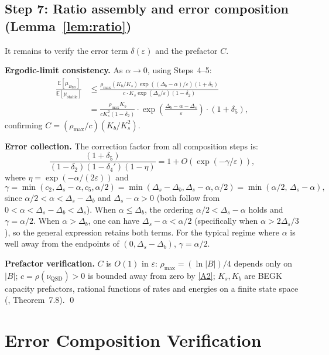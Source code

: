 \documentclass[11pt]{article}
\newcommand{\eps}{\varepsilon}
\newcommand{\Ds}{\Delta_s}
\newcommand{\Db}{\Delta_b}
\newcommand{\BBB}{B_{\mathrm{BB}}}
\newcommand{\QSD}{\mathrm{QSD}}
\newcommand{\muBB}{\mu_{\BBB}}
\begin{document}
\subsection*{Step 7: Ratio assembly and error composition
  (Lemma~\ref{lem:ratio})}

It remains to verify the error term $\delta(\eps)$ and the
prefactor $C$.

\textbf{Ergodic-limit consistency.}
As $\alpha \to 0$, using Steps~4--5:
\begin{align*}
  \frac{\mathbb{E}[\muBB]}{\mathbb{E}[\mu_{\mathrm{stable}}]}
  &\leq \frac{\rho_{\max}(K_b/K_s)\exp((\Db - \alpha)/\eps)
    (1 + \delta_5)}
    {c \cdot K_s \exp(\Ds/\eps)(1 - \delta_2)} \\
  &= \frac{\rho_{\max} K_b}{c K_s^2(1-\delta_2)}
    \cdot \exp\!\left(\frac{\Db - \alpha - \Ds}{\eps}\right)
    \cdot (1 + \delta_5),
\end{align*}
confirming $C = (\rho_{\max}/c)(K_b/K_s^2)$.

\textbf{Error collection.}
The correction factor from all composition steps is:
\[
  \frac{(1 + \delta_5)}{(1 - \delta_2)(1 - \delta_4')(1-\eta)}
  = 1 + O(\exp(-\gamma/\eps)),
\]
where $\eta = \exp(-\alpha/(2\eps))$ and
\begin{equation}\label{eq:gamma-final}
  \gamma = \min(c_2, \Ds - \alpha, c_5, \alpha/2)
  = \min(\Ds - \Db, \Ds - \alpha, \alpha/2)
  = \min(\alpha/2,\, \Ds - \alpha),
\end{equation}
since $\alpha/2 < \alpha < \Ds - \Db$ and $\Ds - \alpha > 0$
(both follow from $0 < \alpha < \Ds - \Db < \Ds$).
When $\alpha \leq \Db$, the ordering
$\alpha/2 < \Ds - \alpha$ holds and $\gamma = \alpha/2$.
When $\alpha > \Db$, one can have $\Ds - \alpha < \alpha/2$
(specifically when $\alpha > 2\Ds/3$), so the general expression
retains both terms.  For the typical regime where $\alpha$ is well
away from the endpoints of $(0, \Ds - \Db)$, $\gamma = \alpha/2$.

\textbf{Prefactor verification.}
$C$ is $O(1)$ in $\eps$:
$\rho_{\max} = (\ln|B|)/4$ depends only on $|B|$;
$c = \rho(\nu_\QSD) > 0$ is bounded away from zero by \ref{A2};
$K_s, K_b$ are BEGK capacity prefactors, rational functions of
rates and energies on a finite state space (\cite{BdH15},
Theorem~7.8).
\qed

\section{Error Composition Verification}
\label{sec:error-verification}
\end{document}
